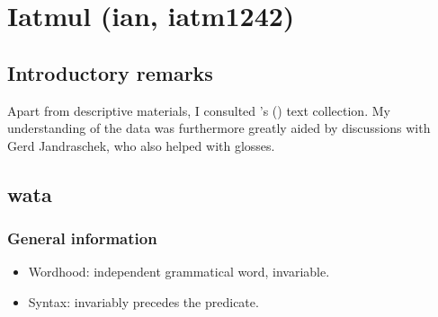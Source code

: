 \section{Iatmul (ian, iatm1242)}
\label{appendixIatmul}
\subsection{Introductory remarks}
Apart from descriptive materials, I consulted \citeauthor{Jandraschek2008}'s (\citeyear{Jandraschek2008}) text collection. My understanding of the data was furthermore greatly aided by discussions with Gerd Jandraschek, who also helped with glosses.

\subsection{wata}

\subsubsection{General information}
\begin{itemize}
	\item Wordhood: independent grammatical word, invariable.
	\item Syntax: invariably precedes the predicate.
\end{itemize}

